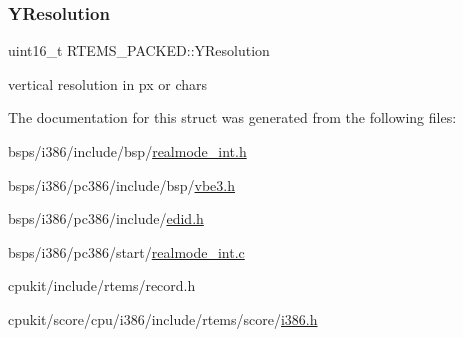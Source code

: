 \subsubsection{\texorpdfstring{YResolution}{YResolution}}
{\footnotesize\ttfamily uint16\+\_\+t R\+T\+E\+M\+S\+\_\+\+P\+A\+C\+K\+E\+D\+::\+Y\+Resolution}

vertical resolution in px or chars 

The documentation for this struct was generated from the following files\+:\begin{DoxyCompactItemize}
\item 
bsps/i386/include/bsp/\mbox{\hyperlink{realmode__int_8h}{realmode\+\_\+int.\+h}}\item 
bsps/i386/pc386/include/bsp/\mbox{\hyperlink{vbe3_8h}{vbe3.\+h}}\item 
bsps/i386/pc386/include/\mbox{\hyperlink{edid_8h}{edid.\+h}}\item 
bsps/i386/pc386/start/\mbox{\hyperlink{realmode__int_8c}{realmode\+\_\+int.\+c}}\item 
cpukit/include/rtems/record.\+h\item 
cpukit/score/cpu/i386/include/rtems/score/\mbox{\hyperlink{i386_8h}{i386.\+h}}\end{DoxyCompactItemize}
